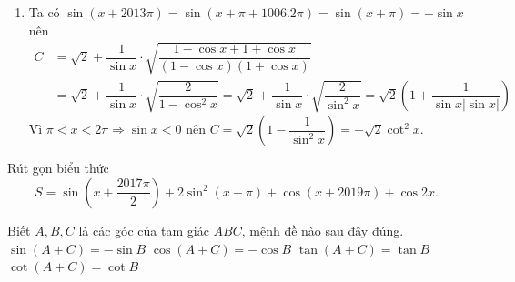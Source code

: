 \begin{bt}
{\begin{enumerate}
			\item Ta có $\sin (x+2013 \pi)=\sin (x+\pi+1006.2 \pi)=\sin (x+\pi)=-\sin x$ nên
			$$
			\begin{aligned}
				C&=\sqrt{2} +\dfrac{1}{\sin x} \cdot \sqrt{\dfrac{1-\cos x+1+\cos x}{(1-\cos x)(1+\cos x)}} \\
				& =\sqrt{2}+\dfrac{1}{\sin x} \cdot \sqrt{\dfrac{2}{1-\cos ^2 x}}=\sqrt{2}+\dfrac{1}{\sin x} \cdot \sqrt{\dfrac{2}{\sin ^2 x}}=\sqrt{2}\left(1+\dfrac{1}{\sin x|\sin x|}\right)
			\end{aligned}
			$$
			Vì $\pi<x<2 \pi \Rightarrow \sin x<0$ nên
			$C=\sqrt{2}\left(1-\dfrac{1}{\sin ^2 x}\right)=-\sqrt{2} \cot ^2 x.$
		\end{enumerate}
	}
\end{bt}

\begin{bt}%
    Rút gọn biểu thức \[S=\sin \left( x+\dfrac{2017\pi }{2} \right)+2{{\sin }^2}\left( x-\pi \right)+\cos \left( x+2019\pi \right)+\cos 2x.\]
\end{bt}


\begin{ex}%
	Biết $A,B,C$ là các góc của tam giác $ABC$, mệnh đề nào sau đây đúng. 
	\choice 
		{$\sin  \left(A+C\right)=-\sin B$}
		{\True $\cos \left(A+C\right)=-\cos B$} 
		 {$\tan \left(A+C\right)=\tan B$}
		 {$\cot \left(A+C\right)=\cot B$}
\end{ex}

